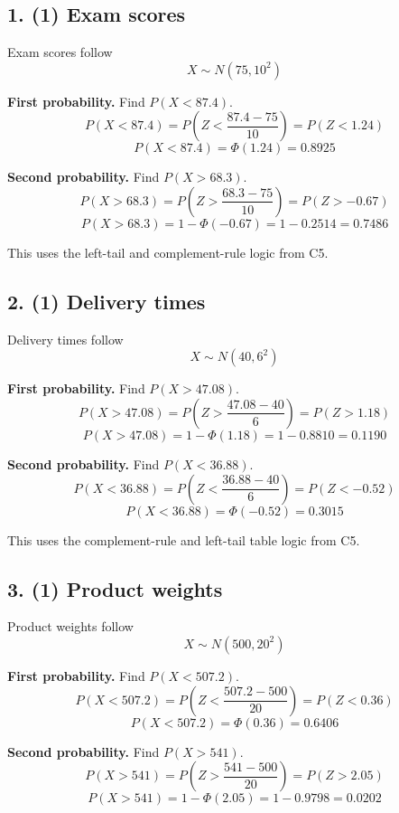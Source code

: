 	\subsection*{1. (1) Exam scores}
	\label{subsec:contextual-normal-distribution-problems-c6-1}
	Exam scores follow
	\[
	X\sim N(75,10^2)
	\]
	
	\textbf{First probability.} Find \(P(X<87.4)\).
	\[
	P(X<87.4)=P\left(Z<\frac{87.4-75}{10}\right)
	=P(Z<1.24)
	\]
	\[
	P(X<87.4)=\Phi(1.24)=0.8925
	\]
	
	\textbf{Second probability.} Find \(P(X>68.3)\).
	\[
	P(X>68.3)=P\left(Z>\frac{68.3-75}{10}\right)
	=P(Z>-0.67)
	\]
	\[
	P(X>68.3)=1-\Phi(-0.67)=1-0.2514=0.7486
	\]
	
	This uses the left-tail and complement-rule logic from C5.
	
	
	\subsection*{2. (1) Delivery times}
	\label{subsec:contextual-normal-distribution-problems-c6-2}
	Delivery times follow
	\[
	X\sim N(40,6^2)
	\]
	
	\textbf{First probability.} Find \(P(X>47.08)\).
	\[
	P(X>47.08)=P\left(Z>\frac{47.08-40}{6}\right)
	=P(Z>1.18)
	\]
	\[
	P(X>47.08)=1-\Phi(1.18)=1-0.8810=0.1190
	\]
	
	\textbf{Second probability.} Find \(P(X<36.88)\).
	\[
	P(X<36.88)=P\left(Z<\frac{36.88-40}{6}\right)
	=P(Z<-0.52)
	\]
	\[
	P(X<36.88)=\Phi(-0.52)=0.3015
	\]
	
	This uses the complement-rule and left-tail table logic from C5.
	
	
	\subsection*{3. (1) Product weights}
	\label{subsec:contextual-normal-distribution-problems-c6-3}
	Product weights follow
	\[
	X\sim N(500,20^2)
	\]
	
	\textbf{First probability.} Find \(P(X<507.2)\).
	\[
	P(X<507.2)=P\left(Z<\frac{507.2-500}{20}\right)
	=P(Z<0.36)
	\]
	\[
	P(X<507.2)=\Phi(0.36)=0.6406
	\]
	
	\textbf{Second probability.} Find \(P(X>541)\).
	\[
	P(X>541)=P\left(Z>\frac{541-500}{20}\right)
	=P(Z>2.05)
	\]
	\[
	P(X>541)=1-\Phi(2.05)=1-0.9798=0.0202
	\]
	
